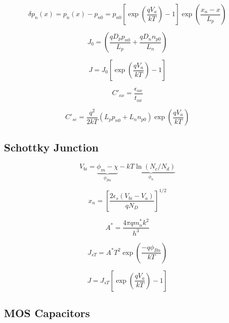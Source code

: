 \documentclass{infosheet}
\begin{document}
\begin{displaymath}
  \delta p_n(x) = p_n(x) - p_{n0} = p_{n0}\left[\exp\left(\frac{qV_a}{kT}\right)-1\right]\exp\left(\frac{x_n-x}{L_p}\right)
\end{displaymath}

\begin{displaymath}
  J_0 = \left(\frac{qD_pp_{n0}}{L_p}+\frac{qD_nn_{p0}}{L_n}\right)
\end{displaymath}

\begin{displaymath}
  J = J_0\left[\exp\left(\frac{qV_a}{kT}\right)-1\right]
\end{displaymath}

\begin{displaymath}
  C'_{ox} = \frac{\epsilon_{ox}}{t_{ox}}
\end{displaymath}

\begin{displaymath}
  C'_{sc} = \frac{q^2}{2kT}(L_pp_{n0} + L_nn_{p0})\exp\left(\frac{qV_a}{kT}\right)
\end{displaymath}

\subsection{Schottky Junction}

\begin{displaymath}
  V_{bi} = \underbrace{\phi_m - \chi}_{\phi_{Bn}} - \underbrace{kT\ln(N_c/N_d)}_{\phi_n}
\end{displaymath}

\begin{displaymath}
  x_n = \left[\frac{2\epsilon_s(V_{bi} - V_a)}{qN_D}\right]^{1/2}
\end{displaymath}

\begin{displaymath}
  A^* = \frac{4\pi qm^*_nk^2}{h^3}
\end{displaymath}

\begin{displaymath}
  J_{sT} = A^*T^2\exp\left(\frac{-q\phi_{Bn}}{kT}\right)
\end{displaymath}

\begin{displaymath}
  J = J_{sT}\left[\exp\left(\frac{qV_a}{kT}\right) - 1\right]
\end{displaymath}

\subsection{MOS Capacitors}
\end{document}
